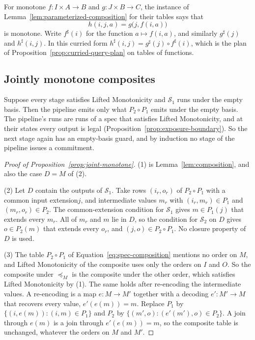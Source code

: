 \documentclass[sigconf]{cidr-2027}
\theoremstyle{remark}
\newcommand{\commitment}{commitment\xspace}
\newcommand{\indesc}{input extension\xspace} %
\newcommand{\outrel}{extends\xspace}          %
\newcommand{\Spec}{\mathcal{S}}
\begin{document}
\color{blue!70!black}For monotone $f:I\times A\to B$ and $g:J\times B\to C$, the instance of
Lemma~\ref{lem:parameterized-composition} for their tables says that
\begin{equation}
  h(i,j,a)=g\bigl(j,f(i,a)\bigr)
  \label{eq:curried-composition}
\end{equation}
is monotone.  Write $f^\sharp(i)$ for the function $a\mapsto f(i,a)$, and
similarly $g^\sharp(j)$ and $h^\sharp(i,j)$.  In this curried form
$h^\sharp(i,j)=g^\sharp(j)\circ f^\sharp(i)$, which is the plan of
Proposition~\ref{prop:curried-query-plan} on tables of functions.\color{black}

\subsection{Jointly monotone composites}

\color{blue!70!black}Suppose every stage satisfies Lifted Monotonicity and $\Spec_1$ runs under
the empty basis.  Then the pipeline emits only what $P_2\circ P_1$ emits under
the empty basis.  The pipeline's runs are runs of a spec that satisfies Lifted
Monotonicity, and at their states every output is legal
(Proposition~\ref{prop:exposure-boundary}).  So the next stage again has an
empty-basis guard, and by induction no stage of the pipeline issues a
\commitment.\color{black}

\begin{proof}[Proof of Proposition~\ref{prop:joint-monotone}]
(1) is Lemma~\ref{lem:composition}, and also the case $D=M$ of (2).

(2) Let $D$ contain the outputs of $\Spec_1$.  Take rows $(i_r,o_r)$ of $P_2\circ
P_1$ with a common \indesc $j$, and intermediate values $m_r$ with
$(i_r,m_r)\in P_1$ and $(m_r,o_r)\in P_2$.  The common-extension condition for
$\Spec_1$ gives $m\in P_1(j)$ that \outrel every $m_r$.  All of $m_r$ and $m$
lie in $D$, so the condition for $\Spec_2$ on $D$ gives $o\in P_2(m)$ that
\outrel every $o_r$, and $(j,o)\in P_2\circ P_1$.  No closure property of $D$
is used.

(3) The table $P_2\circ P_1$ of Equation~\ref{eq:spec-composition} mentions
no order on $M$, and Lifted Monotonicity of the composite uses only the orders
on $I$ and $O$.  So the composite under $\preceq_M$ is the composite under the
other order, which satisfies Lifted Monotonicity by (1).  The same holds after
re-encoding the intermediate values.  A re-encoding is a map $e:M\to M'$
together with a decoding $e':M'\to M$ that recovers every value,
$e'(e(m))=m$.  Replace $P_1$ by $\{(i,e(m)):(i,m)\in P_1\}$ and $P_2$ by
$\{(m',o):(e'(m'),o)\in P_2\}$.  A join through $e(m)$ is a join through
$e'(e(m))=m$, so the composite table is unchanged, whatever the orders on $M$
and $M'$.
\end{proof}
\end{document}
